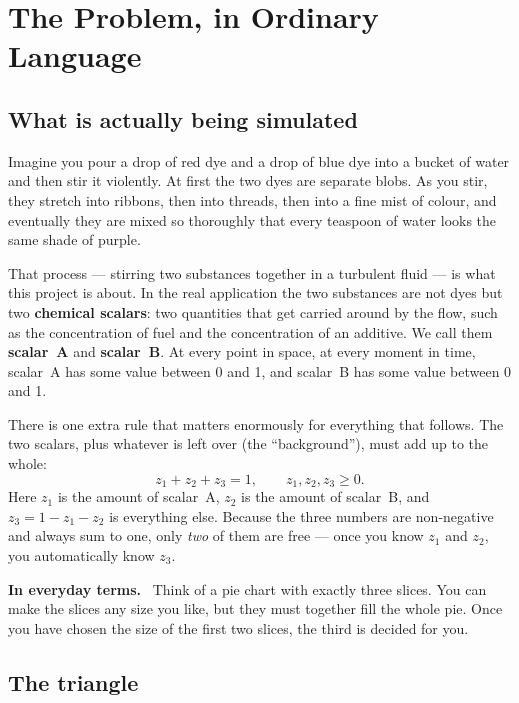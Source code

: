 \documentclass[11pt,a4paper]{report}
\newcommand{\term}[1]{\textbf{#1}}
\renewcommand{\_}{\origtextunderscore\allowbreak}
\newlength{\calloutwidth}
\newcommand{\calloutOpen}{%
  \par\medskip\noindent
  \setlength{\calloutwidth}{\dimexpr\linewidth-2\fboxsep\relax}%
  \begin{lrbox}{\calloutbox}\begin{minipage}{\calloutwidth}}
\newcommand{\calloutClose}[1]{%
  \end{minipage}\end{lrbox}\colorbox{#1}{\usebox{\calloutbox}}\par\medskip}
\newenvironment{analogy}
  {\calloutOpen\textbf{In everyday terms.}\ }
  {\calloutClose{BoxBG}}
\begin{document}
\newpage
\tableofcontents
\newpage

\chapter{The Problem, in Ordinary Language}

\section{What is actually being simulated}

Imagine you pour a drop of red dye and a drop of blue dye into a bucket of water and
then stir it violently. At first the two dyes are separate blobs. As you stir, they
stretch into ribbons, then into threads, then into a fine mist of colour, and eventually
they are mixed so thoroughly that every teaspoon of water looks the same shade of purple.

That process --- stirring two substances together in a turbulent fluid --- is what this
project is about. In the real application the two substances are not dyes but two
\term{chemical scalars}: two quantities that get carried around by the flow, such as the
concentration of fuel and the concentration of an additive. We call them \term{scalar~A}
and \term{scalar~B}. At every point in space, at every moment in time, scalar~A has some
value between 0 and 1, and scalar~B has some value between 0 and 1.

There is one extra rule that matters enormously for everything that follows. The two
scalars, plus whatever is left over (the ``background''), must add up to the whole:
\[
  z_1 + z_2 + z_3 = 1, \qquad z_1, z_2, z_3 \ge 0 .
\]
Here $z_1$ is the amount of scalar~A, $z_2$ is the amount of scalar~B, and $z_3 = 1 - z_1 - z_2$
is everything else. Because the three numbers are non-negative and always sum to one, only
\emph{two} of them are free --- once you know $z_1$ and $z_2$, you automatically know $z_3$.

\begin{analogy}
Think of a pie chart with exactly three slices. You can make the slices any size you
like, but they must together fill the whole pie. Once you have chosen the size of the
first two slices, the third is decided for you.
\end{analogy}

\section{The triangle}
\end{document}
